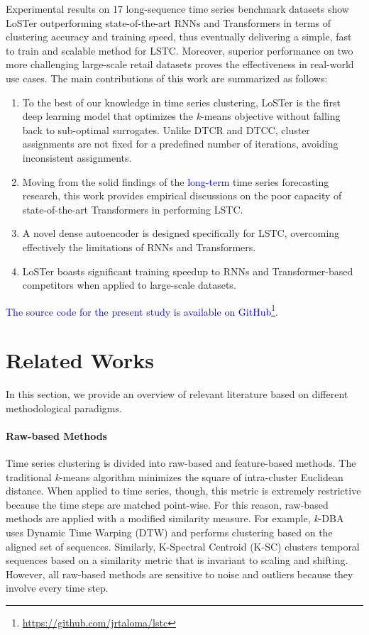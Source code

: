 \documentclass[times, review, 10pt]{elsarticle}
\begin{document}
Experimental results on 17 long-sequence time series benchmark datasets show LoSTer outperforming state-of-the-art RNNs and Transformers in terms of clustering accuracy and training speed, thus eventually delivering a simple, fast to train and scalable method for LSTC. Moreover, superior performance on two more challenging large-scale retail datasets proves the effectiveness in real-world use cases. The main contributions of this work are summarized as follows:

\begin{enumerate}
    \item To the best of our knowledge in time series clustering, LoSTer is the first deep learning model that optimizes the \textit{k}-means objective without falling back to sub-optimal surrogates. Unlike DTCR and DTCC, cluster assignments are not fixed for a predefined number of iterations, avoiding inconsistent assignments.
    \item Moving from the solid findings of the \textcolor{blue}{long-term} time series forecasting research, this work provides empirical discussions on the poor capacity of state-of-the-art Transformers in performing LSTC.
    \item A novel dense autoencoder is designed specifically for LSTC, overcoming effectively the limitations of RNNs and Transformers.
    \item LoSTer boasts significant training speedup to RNNs and Transformer-based competitors when applied to large-scale datasets.
\end{enumerate}

\textcolor{blue}{The source code for the present study is available on GitHub}\footnote{\url{https://github.com/jrtaloma/lstc}}.

\section{Related Works}
In this section, we provide an overview of relevant literature based on different methodological paradigms.

\paragraph{Raw-based Methods} Time series clustering is divided into raw-based and feature-based methods. The traditional \textit{k}-means algorithm minimizes the square of intra-cluster Euclidean distance. When applied to time series, though, this metric is extremely restrictive because the time steps are matched point-wise. For this reason, raw-based methods are applied with a modified similarity measure. For example, \textit{k}-DBA \cite{petitjean2011global} uses Dynamic Time Warping (DTW) and performs clustering based on the aligned set of sequences. Similarly, K-Spectral Centroid (K-SC) \cite{yang2011patterns} clusters temporal sequences based on a similarity metric that is invariant to scaling and shifting. However, all raw-based methods are sensitive to noise and outliers because they involve every time step.
\end{document}
